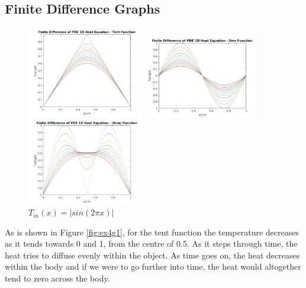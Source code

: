 \documentclass[11pt,a4paper]{article}
\begin{document}
\subsection{Finite Difference Graphs}

\begin{figure}
    \vspace{-13mm}
  		\includegraphics[width=0.45\textwidth]{Ex4_Figs/FiniteTent.png}
	\vspace{-4mm}
  	\caption{$T_{in}(x)= tent(x)$}
	\label{fig:ex4g1}
	\includegraphics[width=0.45\textwidth]{Ex4_Figs/FiniteSine.png}
	\vspace{-4mm}
  	\caption{$T_{in}(x)= sin(2{\pi}x)$}
	\label{fig:ex4g2}
    \includegraphics[width=0.45\textwidth]{Ex4_Figs/FiniteSineabs.png}
    \vspace{-4mm}
    \caption{$T_{in}(x)= |sin(2{\pi}x)|$}
  	\label{fig:ex4g3}
\end{figure}

As is shown in Figure \ref{fig:ex4g1}, for the tent function the temperature decreases as it tends towards 0 and 1, from the centre of 0.5. As it steps through time, the heat tries to diffuse evenly within the object. As time goes on, the heat decreases within the body and if we were to go further into time, the heat would altogether tend to zero across the body.
\end{document}
